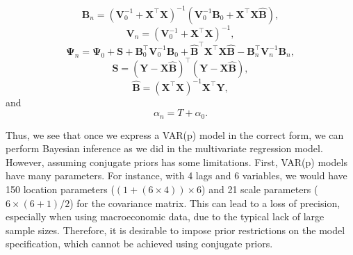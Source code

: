 \[
{\bm{B}}_n = ({\bm{V}}_{0}^{-1} + {\bm{X}}^{\top}{\bm{X}})^{-1}({\bm{V}}_{0}^{-1}{\bm{B}}_{0} + {\bm{X}}^{\top}{\bm{X}} \widehat{\bm{B}}),
\]
\[
{\bm{V}}_n = ({\bm{V}}_{0}^{-1} + {\bm{X}}^{\top}{\bm{X}})^{-1},
\]
\[
{\bm{\Psi}}_n = {\bm{\Psi}}_{0} + {\bm{S}} + {\bm{B}}_{0}^{\top}{\bm{V}}_{0}^{-1}{\bm{B}}_{0} + \widehat{\bm{B}}^{\top}{\bm{X}}^{\top}{\bm{X}} \widehat{\bm{B}} - {\bm{B}}_n^{\top} {\bm{V}}_n^{-1} {\bm{B}}_n,
\]
\[
{\bm{S}} = ({\bm{Y}} - {\bm{X}} \widehat{\bm{B}})^{\top}({\bm{Y}} - {\bm{X}} \widehat{\bm{B}}),
\]
\[
\widehat{\bm{B}} = ({\bm{X}}^{\top}{\bm{X}})^{-1}{\bm{X}}^{\top}{\bm{Y}},
\]
and 
\[
\alpha_n = T + \alpha_0.
\]


Thus, we see that once we express a VAR(p) model in the correct form, we can perform Bayesian inference as we did in the multivariate regression model. However, assuming conjugate priors has some limitations. First, VAR(p) models have many parameters. For instance, with 4 lags and 6 variables, we would have 150 location parameters ($(1 + (6 \times 4)) \times 6$) and 21 scale parameters ($6 \times (6 + 1)/2$) for the covariance matrix. This can lead to a loss of precision, especially when using macroeconomic data, due to the typical lack of large sample sizes. Therefore, it is desirable to impose prior restrictions on the model specification, which cannot be achieved using conjugate priors. 


